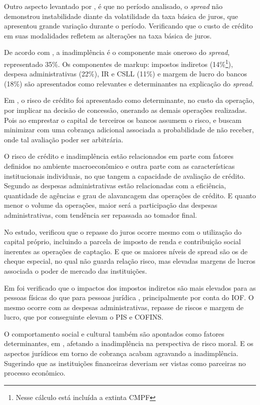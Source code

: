 \documentclass[
  12pt,
  12pt,
  openright,
  oneside,
  a4paper,
  chapter=TITLE,
  section=TITLE,
  subsection=TITLE,
  subsubsection=TITLE,
  portugues,
  sumario=tradicional]{abntex2}
\begin{document}
Outro aspecto levantado por \textcite{BCB:1999}, é que no período analisado, o \emph{spread} não demonstrou instabilidade diante da volatilidade da taxa básica de juros, que apresentou grande variação durante o período. Verificando que o custo de crédito em suas modalidades refletem as alterações na taxa básica de juros.

De acordo com \textcite{BCB:1999}, a inadimplência é o componente mais oneroso do \emph{spread}, representado 35\%. Os componentes de markup: impostos indiretos (14\%\footnote{Nesse cálculo está incluída a extinta CMPF}), despesa administrativas (22\%), IR e CSLL (11\%) e margem de lucro do bancos (18\%) são apresentados como relevantes e determinantes na explicação do \emph{spread}.

Em \textcite{BCB:1999}, o risco de crédito foi apresentado como determinante, no custo da operação, por implicar na decisão de concessão, onerando as demais operações realizadas. Pois ao emprestar o capital de terceiros os bancos assumem o risco, e buscam minimizar com uma cobrança adicional associada a probabilidade de não receber, onde tal avaliação poder ser arbitrária.

O risco de crédito e inadimplência estão relacionados em parte com fatores definidos no ambiente macroeconômico e outra parte com as características institucionais individuais, no que tangem a capacidade de avaliação de crédito.
Segundo \textcite{BCB:1999} as despesas administrativas estão relacionadas com a eficiência, quantidade de agências e grau de alavancagem das operações de crédito. E quanto menor o volume da operações, maior será a participação das despesas administrativas, com tendência ser repassada ao tomador final.

No estudo, \textcite{BCB:1999} verificou que o repasse do juros ocorre mesmo com o utilização do capital próprio, incluindo a parcela de imposto de renda e contribuição social inerentes as operações de captação. E que os maiores níveis de spread são os de cheque especial, no qual não guarda relação risco, mas elevadas margens de lucros associada o poder de mercado das instituições.

Em \textcite{BCB:1999} foi verificado que o impactos dos impostos indiretos são mais elevados para as pessoas físicas do que para pessoas jurídica , principalmente por conta do IOF. O mesmo ocorre com as despesas administrativas, repasse de riscos e margem de lucro, que por conseguinte elevam o PIS e COFINS.

O comportamento social e cultural também são apontados como fatores determinantes, em \textcite{BCB:1999}, afetando a inadimplência na perspectiva de risco moral. E os aspectos jurídicos em torno de cobrança acabam agravando a inadimplência. Sugerindo que as instituições financeiras deveriam ser vistas como parceiras no processo econômico.
\end{document}
